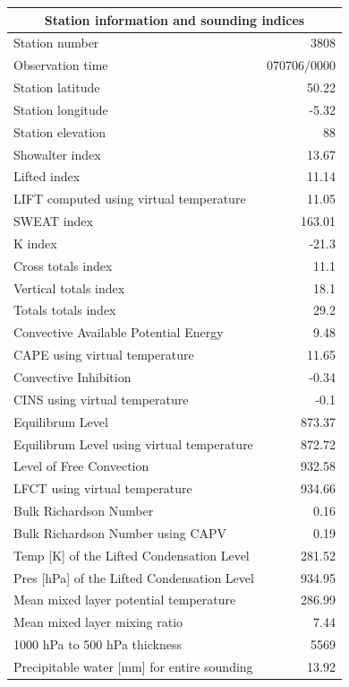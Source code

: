 \documentclass{article}
\begin{document}
\begin{longtable}{l|r}
\multicolumn{2}{c}{\textbf{Station information and sounding indices}} \\ \hline
Station number & 3808 \\
Observation time & \multicolumn{1}{l}{ 070706/0000} \\
Station latitude & 50.22 \\
Station longitude & -5.32 \\
Station elevation & 88 \\
Showalter index & 13.67 \\
Lifted index & 11.14 \\
LIFT computed using virtual temperature & 11.05 \\
SWEAT index & 163.01 \\
K index & -21.3 \\
Cross totals index & 11.1 \\
Vertical totals index & 18.1 \\
Totals totals index & 29.2 \\
Convective Available Potential Energy & 9.48 \\
CAPE using virtual temperature & 11.65 \\
Convective Inhibition & -0.34 \\
CINS using virtual temperature & -0.1 \\
Equilibrum Level & 873.37 \\
Equilibrum Level using virtual temperature & 872.72 \\
Level of Free Convection & 932.58 \\
LFCT using virtual temperature & 934.66 \\
Bulk Richardson Number & 0.16 \\
Bulk Richardson Number using CAPV & 0.19 \\
Temp [K] of the Lifted Condensation Level & 281.52 \\
Pres [hPa] of the Lifted Condensation Level & 934.95 \\
Mean mixed layer potential temperature & 286.99 \\
Mean mixed layer mixing ratio & 7.44 \\
1000 hPa to 500 hPa thickness & 5569 \\
Precipitable water [mm] for entire sounding & 13.92 \\
\end{longtable}%
\end{document}
